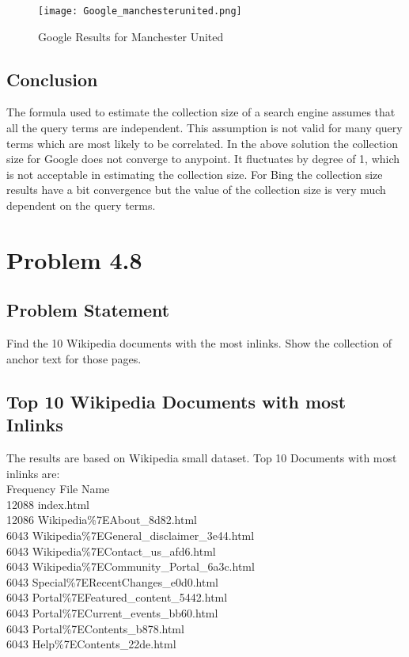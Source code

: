 \documentclass[12pt]{report}
\begin{document}
\begin{figure}[ht] 
  \centering
  \texttt{[image: Google\_manchesterunited.png]}
  \caption{Google Results for Manchester United}
  \label{fig:24}
\end{figure}

\section{Conclusion}
The formula used to estimate the collection size of a search engine assumes that all the query terms are independent. This assumption is not valid for many query terms which are most likely to be correlated. In the above solution the collection size for Google does not converge to anypoint. It fluctuates by degree of 1, which is not acceptable in estimating the collection size. For Bing the collection size results have a bit convergence but the value of the collection size is very much dependent on the query terms. 

\chapter{Problem 4.8}
\section{Problem Statement}
Find the 10 Wikipedia documents with the most inlinks. Show the collection of anchor text for those pages.
\section{Top 10 Wikipedia Documents with most Inlinks}
The results are based on Wikipedia small dataset.
 Top 10 Documents with most inlinks are:\\
Frequency File Name\\
  12088 index.html\\
  12086 Wikipedia\%7EAbout\_8d82.html\\
   6043 Wikipedia\%7EGeneral\_disclaimer\_3e44.html\\
   6043 Wikipedia\%7EContact\_us\_afd6.html\\
   6043 Wikipedia\%7ECommunity\_Portal\_6a3c.html\\
   6043 Special\%7ERecentChanges\_e0d0.html\\
   6043 Portal\%7EFeatured\_content\_5442.html\\
   6043 Portal\%7ECurrent\_events\_bb60.html\\
   6043 Portal\%7EContents\_b878.html\\
   6043 Help\%7EContents\_22de.html\\
\end{document}

